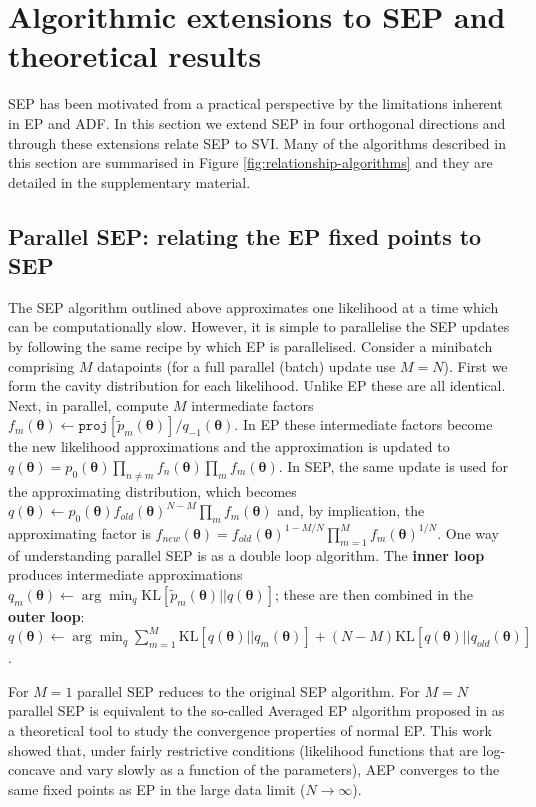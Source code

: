 \section{Algorithmic extensions to SEP and theoretical results}
%
SEP has been motivated from a practical perspective by the limitations inherent in EP and ADF. In this section we extend SEP in four orthogonal directions and through these extensions relate SEP to SVI. Many of the algorithms described in this section are summarised in Figure \ref{fig:relationship-algorithms} and they are detailed in the supplementary material.

%
\subsection{Parallel SEP: relating the EP fixed points to SEP}
%

The SEP algorithm outlined above approximates one likelihood at a time which can be computationally slow. However, it is simple to parallelise the SEP updates by following the same recipe by which EP is parallelised. Consider a minibatch comprising $M$ datapoints (for a full parallel (batch) update use $M=N$). First we form the cavity distribution for each likelihood. Unlike EP these are all identical. Next, in parallel, compute $M$ intermediate factors $f_m(\bm{\theta}) \leftarrow \mathtt{proj}[\tilde{p}_m(\bm{\theta})] / q_{-1}(\bm{\theta})$. In EP these intermediate factors become the new likelihood approximations and the approximation is updated to $q(\bm{\theta}) = p_0(\bm{\theta}) \prod_{n \ne m} f_n(\bm{\theta}) \prod_{m} f_m(\bm{\theta}) $. In SEP, the same update is used for the approximating distribution, which becomes $q(\bm{\theta}) \leftarrow p_0(\bm{\theta}) f_{old}(\bm{\theta})^{N-M} \prod_{m} f_m(\bm{\theta}) $ and, by implication, the approximating factor is $f_{new}(\bm{\theta}) = f_{old}(\bm{\theta})^{1-M/N} \prod_{m=1}^M f_m(\bm{\theta})^{1/N}$. One way of understanding parallel SEP is as a double loop algorithm. The \textbf{inner loop} produces intermediate approximations  $q_m(\bm{\theta}) \leftarrow \arg\min_q \mathrm{KL}[\tilde{p}_m(\bm{\theta}) ||q(\bm{\theta})]$; these are then combined in the \textbf{outer loop}: $q(\bm{\theta}) \leftarrow \arg\min_q \sum_{m=1}^M \mathrm{KL}[q(\bm{\theta}) ||q_m(\bm{\theta})] + (N-M) \mathrm{KL}[q(\bm{\theta}) || q_{old}(\bm{\theta})]$.
%

For $M=1$ parallel SEP reduces to the original SEP algorithm. For $M=N$ parallel SEP is equivalent to the so-called Averaged EP algorithm proposed in \cite{barthelme:aep} as a theoretical tool to study the convergence properties of normal EP. This work showed that, under fairly restrictive conditions (likelihood functions that are log-concave and vary slowly as a function of the parameters), AEP converges to the same fixed points as EP in the large data limit ($N \rightarrow \infty$).

